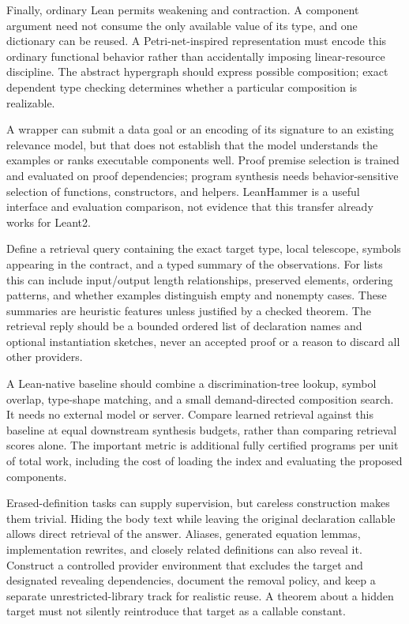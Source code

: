 Finally, ordinary Lean permits weakening and contraction. A component argument need not consume the only available value of its type, and one dictionary can be reused. A Petri-net-inspired representation must encode this ordinary functional behavior rather than accidentally imposing linear-resource discipline. The abstract hypergraph should express possible composition; exact dependent type checking determines whether a particular composition is realizable.


\answer A wrapper can submit a data goal or an encoding of its signature to an existing relevance model, but that does not establish that the model understands the examples or ranks executable components well. Proof premise selection is trained and evaluated on proof dependencies; program synthesis needs behavior-sensitive selection of functions, constructors, and helpers. LeanHammer is a useful interface and evaluation comparison, not evidence that this transfer already works for Leant2.\cite{leanhammer}

Define a retrieval query containing the exact target type, local telescope, symbols appearing in the contract, and a typed summary of the observations. For lists this can include input/output length relationships, preserved elements, ordering patterns, and whether examples distinguish empty and nonempty cases. These summaries are heuristic features unless justified by a checked theorem. The retrieval reply should be a bounded ordered list of declaration names and optional instantiation sketches, never an accepted proof or a reason to discard all other providers.

A Lean-native baseline should combine a discrimination-tree lookup, symbol overlap, type-shape matching, and a small demand-directed composition search. It needs no external model or server. Compare learned retrieval against this baseline at equal downstream synthesis budgets, rather than comparing retrieval scores alone. The important metric is additional fully certified programs per unit of total work, including the cost of loading the index and evaluating the proposed components.

Erased-definition tasks can supply supervision, but careless construction makes them trivial. Hiding the body text while leaving the original declaration callable allows direct retrieval of the answer. Aliases, generated equation lemmas, implementation rewrites, and closely related definitions can also reveal it. Construct a controlled provider environment that excludes the target and designated revealing dependencies, document the removal policy, and keep a separate unrestricted-library track for realistic reuse. A theorem about a hidden target must not silently reintroduce that target as a callable constant.

